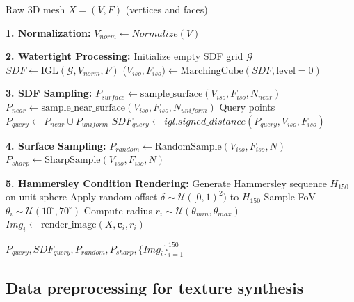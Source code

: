 \begin{algorithm}
\caption{3D Data Preprocessing Pipeline}\label{alg:preprocess}
\begin{algorithmic}[1]
\Require Raw 3D mesh $X = (V,F)$ (vertices and faces)

\State \textbf{1. Normalization:}
\State $V_{norm} \gets Normalize(V)$

\State \textbf{2. Watertight Processing:}
\State Initialize empty SDF grid $\mathcal{G}$
\State $SDF \gets \text{IGL}(\mathcal{G}, V_{norm}, F)$
\State ($V_{iso}, F_{iso}) \gets \text{MarchingCube}(SDF, \text{level}=0)$

\State \textbf{3. SDF Sampling:}
\State $P_{surface} \gets \text{sample\_surface}(V_{iso}, F_{iso}, N_{near})$ 
\State $P_{near} \gets \text{sample\_near\_surface}(V_{iso}, F_{iso}, N_{uniform})$ 
\State Query points $P_{query} \gets P_{near} \cup P_{uniform}$ 
\State $ SDF_{query} \gets igl.signed\_distance(P_{query}, V_{iso}, F_{iso})$

\State \textbf{4. Surface Sampling:}
\State $P_{random} \gets \text{RandomSample}(V_{iso}, F_{iso}, N)$
\State $P_{sharp} \gets \text{SharpSample}(V_{iso}, F_{iso}, N)$ 

\State \textbf{5. Hammersley Condition Rendering:}
\State Generate Hammersley sequence $H_{150}$ on unit sphere
\State Apply random offset $\delta \sim \mathcal{U}([0,1)^2)$ to $H_{150}$
    \State Sample FoV $\theta_i \sim \mathcal{U}(10^\circ,70^\circ)$
    \State Compute radius $r_i \sim \mathcal{U}(\theta_{min},\theta_{max})$
    \State $Img_i \gets \text{render\_image}(X, \mathbf{c}_i, r_i)$
\EndFor

\State \Return $P_{query}, SDF_{query}, P_{random}, P_{sharp}, \{Img_i\}_{i=1}^{150}$
\end{algorithmic}
\end{algorithm}


\subsection{Data preprocessing for texture synthesis}

